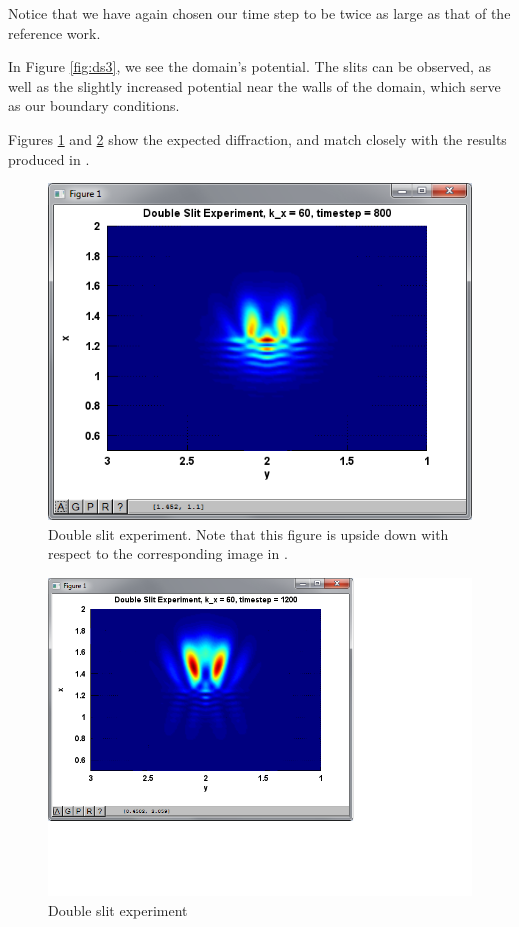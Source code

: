 \documentclass[letterpaper,12pt]{article}
\begin{document}
Notice that we have again chosen our time step to be twice as large as that of the reference work.  

In Figure \ref{fig:ds3}, we see the domain's potential.  The slits can be observed, as well as the slightly increased potential near the walls of the domain, which serve as our boundary conditions.

Figures \ref{fig:ds1} and \ref{fig:ds2} show the expected diffraction, and match closely with the results produced in \citep{reference}.

\begin{figure}[!htbp]
\centering
\includegraphics[scale=0.85,trim = 20mm 20mm 20mm 9mm,clip=true]{doubleslit800.png}
\caption{Double slit experiment.  Note that this figure is upside down with respect to the corresponding image in \citep{reference}.}
\label{fig:ds1}
\end{figure}

\begin{figure}[!htbp]
\centering
\includegraphics[scale=0.85,trim = 20mm 50mm 70mm 9mm,clip=true]{doubleslit1200.png}
\caption{Double slit experiment}
\label{fig:ds2}
\end{figure}
\end{document}
